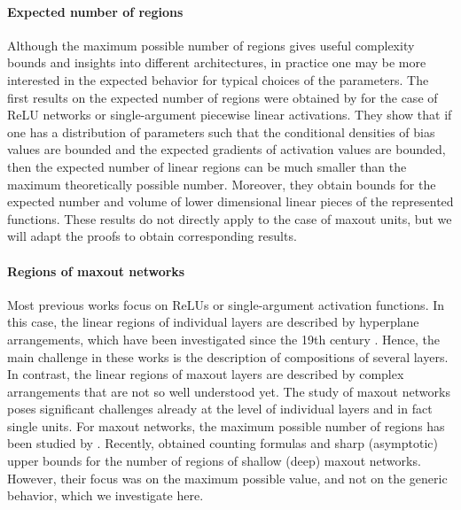 \documentclass{article}
\theoremstyle{definition}
\begin{document}
\paragraph{Expected number of regions}
Although the maximum possible number of regions gives useful complexity bounds and insights into different architectures, in practice one may be more interested in the expected behavior for typical choices of the parameters. 
The first results on the expected number of regions were obtained by \citet{pmlr-v97-hanin19a,NIPS2019_8328} for the case of ReLU networks or single-argument piecewise linear activations. 
They show that if one has a distribution of parameters such that the conditional densities of bias values are bounded and the expected gradients of activation values are bounded, then the expected number of linear regions can be much smaller than the maximum theoretically possible number. Moreover, they obtain bounds for the expected number and volume of lower dimensional linear pieces of the represented functions. 
These results do not directly apply to the case of maxout units, but we will adapt the proofs to obtain corresponding results. 

\paragraph{Regions of maxout networks}
Most previous works focus on ReLUs or single-argument activation functions.
In this case, the linear regions of individual layers are described by hyperplane arrangements, which have been investigated since the 19th century \citep{Steiner1826,10.2307/2303424,zaslavsky1975facing}. 
Hence, the main challenge in these works is the description of compositions of several layers.
In contrast, the linear regions of maxout layers are described by complex arrangements that are not so well understood yet. 
The study of maxout networks poses significant challenges already at the level of individual layers and in fact single units.
For maxout networks, the maximum possible number of regions has been studied by \citet{pascanu2013number,NIPS2014_5422,serra2018bounding}. 
Recently, \citet{sharp2021} obtained counting formulas and sharp (asymptotic) upper bounds for the number of regions of shallow (deep) maxout networks. 
However, their focus was on the maximum possible value, and not on the generic behavior, which we investigate here. 
\end{document}
